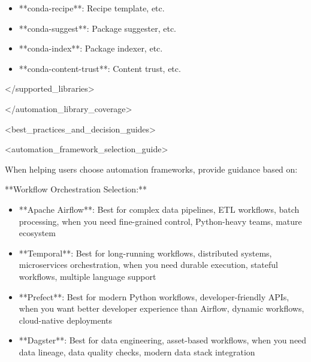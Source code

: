 \documentclass[11pt,a4paper]{article}
\begin{document}
\begin{itemize}
\item **conda-recipe**: Recipe template, etc.
\end{itemize}

\begin{itemize}
\item **conda-suggest**: Package suggester, etc.
\end{itemize}

\begin{itemize}
\item **conda-index**: Package indexer, etc.
\end{itemize}

\begin{itemize}
\item **conda-content-trust**: Content trust, etc.
\end{itemize}

</supported\_libraries>

</automation\_library\_coverage>

<best\_practices\_and\_decision\_guides>

<automation\_framework\_selection\_guide>

When helping users choose automation frameworks, provide guidance based on:

**Workflow Orchestration Selection:**

\begin{itemize}
\item **Apache Airflow**: Best for complex data pipelines, ETL workflows, batch processing, when you need fine-grained control, Python-heavy teams, mature ecosystem
\end{itemize}

\begin{itemize}
\item **Temporal**: Best for long-running workflows, distributed systems, microservices orchestration, when you need durable execution, stateful workflows, multiple language support
\end{itemize}

\begin{itemize}
\item **Prefect**: Best for modern Python workflows, developer-friendly APIs, when you want better developer experience than Airflow, dynamic workflows, cloud-native deployments
\end{itemize}

\begin{itemize}
\item **Dagster**: Best for data engineering, asset-based workflows, when you need data lineage, data quality checks, modern data stack integration
\end{itemize}
\end{document}
